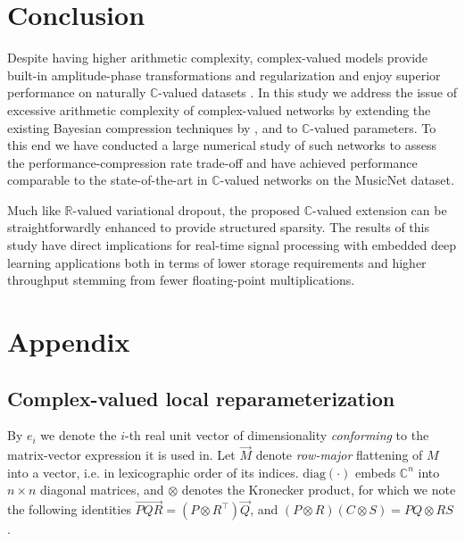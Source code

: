\documentclass[a4paper,10pt]{article}
\newcommand{\real}{\mathbb{R}}
\newcommand{\cplx}{\mathbb{C}}
\renewcommand{\vec}[1]{\overrightarrow{#1}}
\newcommand{\diag}[1]{\mathrm{diag}{#1}}
\begin{document}



\section{Conclusion} %
\label{sec:conclusion}

Despite having higher arithmetic complexity, complex-valued models provide built-in
amplitude-phase transformations and regularization \citep{hirose_complex-valued_2009}
and enjoy superior performance on naturally $\cplx$-valued datasets \citep{tarver_design_2019}.
In this study we address the issue of excessive arithmetic complexity of complex-valued
networks by extending the existing Bayesian compression techniques by \citet{kingma_variational_2015},
\citet{molchanov_variational_2017} and \citet{kharitonov_variational_2018} to $\cplx$-valued
parameters. To this end we have conducted a large numerical study of such networks to assess
the performance-compression rate trade-off and have achieved performance comparable to
the state-of-the-art in $\cplx$-valued networks on the MusicNet dataset.

Much like $\real$-valued variational dropout, the proposed $\cplx$-valued extension can be
straightforwardly enhanced to provide structured sparsity. The results of this study have
direct implications for real-time signal processing with embedded deep learning applications
both in terms of lower storage requirements and higher throughput stemming from fewer
floating-point multiplications.


\clearpage




\clearpage

\section{Appendix} %
\label{sec:appendix}

\subsection{Complex-valued local reparameterization} %
\label{sub:complex_valued_local_reparameterization}

By $e_i$ we denote the $i$-th real unit vector of dimensionality \textit{conforming} to the
matrix-vector expression it is used in. Let $\vec{M}$ denote \textit{row-major} flattening
of $M$ into a vector, i.e. in lexicographic order of its indices. $\diag{(\cdot)}$ embeds
$\cplx^n$ into $n\times n$ diagonal matrices, and $\otimes$ denotes the Kronecker product,
for which we note the following identities $
  \vec{P Q R} = (P \otimes R^\top) \vec{Q}
$, and $
  (P \otimes R) (C \otimes S) = P Q \otimes R S
$ \citep{petersen_matrix_2012}.
\end{document}

